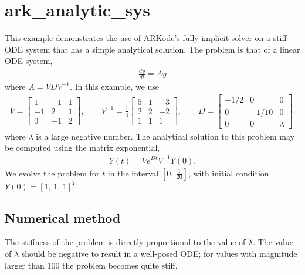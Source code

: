 \documentclass[letterpaper,10pt,english]{sphinxmanual}
\begin{document}
\section{ark\_analytic\_sys}
\label{\detokenize{cpp_serial:id1}}\label{\detokenize{cpp_serial:ark-analytic-sys}}
This example demonstrates the use of ARKode’s fully implicit solver on
a stiff ODE system that has a simple analytical solution.  The problem
is that of a linear ODE system,
\begin{equation*}
\begin{split}\frac{dy}{dt} = Ay\end{split}
\end{equation*}
where \(A = V D V^{-1}\).  In this example, we use
\begin{equation*}
\begin{split}V = \left[\begin{array}{rrr} 1 & -1 & 1\\ -1 & 2 & 1\\ 0 & -1 & 2
    \end{array}\right], \qquad
V^{-1} = \frac14 \left[\begin{array}{rrr} 5 & 1 & -3\\ 2 & 2 & -2\\
    1 & 1 & 1 \end{array}\right], \qquad
D = \left[\begin{array}{rrr} -1/2 & 0 & 0\\ 0 & -1/10 & 0\\ 0 & 0 &
    \lambda \end{array}\right].\end{split}
\end{equation*}
where \(\lambda\) is a large negative number. The analytical
solution to this problem may be computed using the matrix exponential,
\begin{equation*}
\begin{split}Y(t) = V e^{Dt} V^{-1} Y(0).\end{split}
\end{equation*}
We evolve the problem for \(t\) in the interval \(\left[0,\,
\frac{1}{20}\right]\), with initial condition \(Y(0) = \left[1,\,
1,\, 1\right]^T\).


\subsection{Numerical method}
\label{\detokenize{cpp_serial:numerical-method}}
The stiffness of the problem is directly proportional to the
value of \(\lambda\).  The value of \(\lambda\) should be
negative to result in a well-posed ODE; for values with magnitude
larger than 100 the problem becomes quite stiff.
\end{document}

